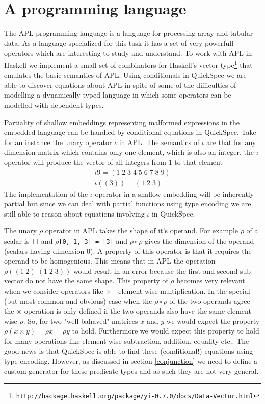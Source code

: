 \section{A programming language}\label{apl}
The APL programming language \cite{Iverson1962}\cite{APLdic}
is a language for processing array and tabular data.
As a language specialized for this task it has a set of very powerfull
operators which are interesting to study and understand.
To work with APL in Haskell we implement a small
set of combinators for Haskell's vector
type\footnote{\texttt{http://hackage.haskell.org/package/yi-0.7.0/docs/Data-Vector.html}}
that emulates the basic semantics of APL.
Using conditionals in QuickSpec we are able to discover
equations about APL in spite of some of the
difficulties of modelling a dynamically typed language
in which some operators can be modelled with dependent types.

Partiality of shallow embeddings representing malformed expressions in the
embedded language can be handled by conditional equations in QuickSpec.
Take for an instance the unary operator $\iota$ in APL. The semantics
of $\iota$ are that for any dimension matrix which contains only one element, which is also
an integer, the $\iota$ operator will produce the vector of all integers from 1 to that element
\begin{gather*}
    \iota 9 = (1\;2\;3\;4\;5\;6\;7\;8\;9)\\
    \iota ((3)) = (1\;2\;3)
\end{gather*}
The implementation of the $\iota$ operator in a shallow embedding will be inherently partial
but since we can deal with partial functions using type encoding we are still able to reason
about equations involving $\iota$ in QuickSpec.

The unary $\rho$ operator in APL takes the shape of it's operand.
For example $\rho$ of a scalar is \texttt{[]} 
and $\rho$\texttt{[0, 1, 3] = [3]} and
$\rho\circ\rho$ gives the dimension of the operand (scalars having dimension 0).
A property of this operator is that it requires the operand to be homogenious.
This means that in APL the operation $\rho((1\;2)\;(1\;2\;3))$
would result in an error because the first and second sub-vector do not have the same shape.
This property of $\rho$ becomes very relevant when we consider operators like $\times$ - element wise
multiplication. In the special (but most common and obvious) case
when the $\rho\circ\rho$ of the two operands agree the $\times$ operation
is only defined if the two operands also have the same element-wise $\rho$. So, for two "well bahaved" matrices
$x$ and $y$ we would expect the property $\rho(x \times y) = \rho x = \rho y$ to hold. Furthermore
we would expect this property to hold for many operations like element wise subtraction, addition, equality etc..
The good news is that QuickSpec is able to find these (conditional!) equations using type encoding. However,
as discussed in section \ref{conjunction} we need to define a custom generator for these predicate types
and as such they are not very general.
